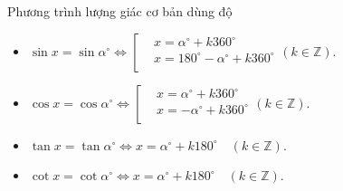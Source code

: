 
\begin{dang}{Phương trình lượng giác cơ bản dùng độ}
		\begin{itemize}
			\item $\sin x=\sin\alpha^\circ\Leftrightarrow \left[\begin{aligned}
			&x=\alpha^\circ+k360^\circ\\
			&x=180^\circ-\alpha^\circ+k360^\circ\\
			\end{aligned}\right.\left(k\in\mathbb{Z}\right).$
			\item $\cos x=\cos\alpha^\circ\Leftrightarrow \left[\begin{aligned}
			&x=\alpha^\circ+k360^\circ\\
			&x=-\alpha^\circ+k360^\circ\\
			\end{aligned}\right.\left(k\in\mathbb{Z}\right).$
			\item $\tan x=\tan\alpha^\circ\Leftrightarrow x=\alpha^\circ+k180^\circ\quad\left(k\in\mathbb{Z}\right)$.
			\item $\cot x=\cot\alpha^\circ\Leftrightarrow x=\alpha^\circ+k180^\circ\quad\left(k\in\mathbb{Z}\right)$.
		\end{itemize}
\end{dang}
